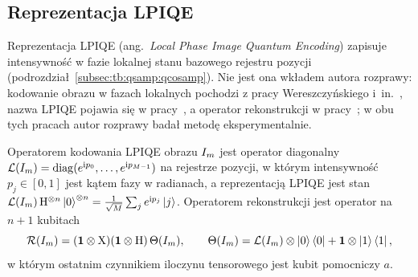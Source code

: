 \subsection{Reprezentacja LPIQE}\label{subsec:tb:qimg:lpiqe}

Reprezentacja LPIQE (ang.\ \emph{Local Phase Image Quantum Encoding}) zapisuje intensywność w fazie lokalnej stanu bazowego rejestru pozycji (podrozdział~\ref{subsec:tb:qsamp:qcosamp}).
Nie jest ona wkładem autora rozprawy: kodowanie obrazu w fazach lokalnych pochodzi z pracy Wereszczyńskiego i~in.~\cite{wereszczynski_cosine_2020}, nazwa LPIQE pojawia się w pracy~\cite{werner_data_loss_2023}, a operator rekonstrukcji w pracy~\cite{werner_error_reduction_2025}; w obu tych pracach autor rozprawy badał metodę eksperymentalnie.

\begin{Definition}[LPIQE]\label{def:tb:qimg:lpiqe}
Operatorem kodowania LPIQE obrazu $I_m$ jest operator diagonalny $\mathcal{L}(I_m)=\operatorname{diag}(e^{\mathrm{i}p_0},\dots,e^{\mathrm{i}p_{M-1}})$ na rejestrze pozycji, w którym intensywność $p_j\in[0,1]$ jest kątem fazy w radianach, a reprezentacją LPIQE jest stan $\mathcal{L}(I_m)\,\mathrm{H}^{\otimes n}\ket{0}^{\otimes n}=\frac{1}{\sqrt{M}}\sum_{j}e^{\mathrm{i}p_j}\ket{j}$.
Operatorem rekonstrukcji jest operator na $n+1$ kubitach
\begin{equation}\label{eq:tb:qimg:recon-op}
\mathcal{R}(I_m)=(\mathbf{1}\otimes\mathrm{X})(\mathbf{1}\otimes\mathrm{H})\,\Theta(I_m),
\qquad
\Theta(I_m)=\mathcal{L}(I_m)\otimes\ket{0}\bra{0}+\mathbf{1}\otimes\ket{1}\bra{1},
\end{equation}
w którym ostatnim czynnikiem iloczynu tensorowego jest kubit pomocniczy $a$.
\end{Definition}

